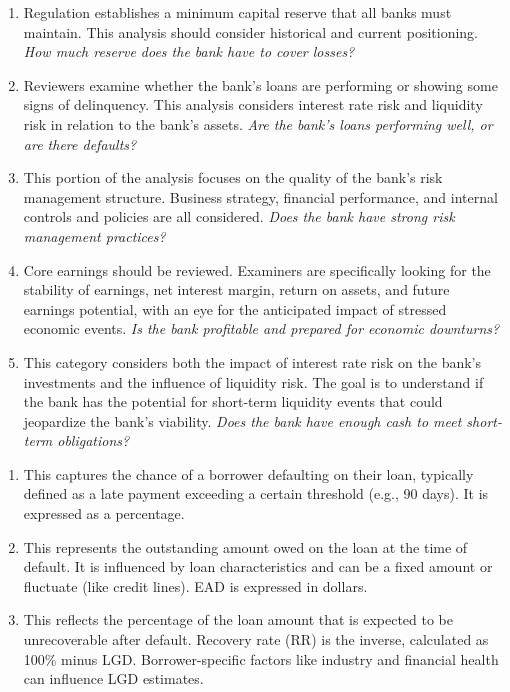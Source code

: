 \begin{enumerate}
\item {} Regulation establishes a minimum capital reserve
that all banks must maintain. This analysis should consider historical and
current positioning. \emph{How much reserve does the bank have to cover losses?}
\item {} Reviewers examine whether the bank's loans are
performing or showing some signs of delinquency. This analysis considers interest
rate risk and liquidity risk in relation to the bank's assets. \emph{Are the
bank's loans performing well, or are there defaults?}
\item {} This portion of the analysis focuses on the quality of
the bank's risk management structure. Business strategy, financial performance,
and internal controls and policies are all considered. \emph{Does the bank have
strong risk management practices?}
\item {} Core earnings should be reviewed. Examiners are
specifically looking for the stability of earnings, net interest margin, return on
assets, and future earnings potential, with an eye for the anticipated impact of
stressed economic events. \emph{Is the bank profitable and prepared for economic
downturns?}
\item {} This category considers both the impact of interest rate
risk on the bank's investments and the influence of liquidity risk. The goal is to
understand if the bank has the potential for short-term liquidity events that
could jeopardize the bank's viability. \emph{Does the bank have enough cash to
meet short-term obligations?}
\end{enumerate}


\begin{enumerate}
\item {} This captures the chance of a borrower
defaulting on their loan, typically defined as a late payment exceeding a certain
threshold (e.g., 90 days). It is expressed as a percentage.
\item {} This represents the outstanding amount
owed on the loan at the time of default. It is influenced by loan characteristics
and can be a fixed amount or fluctuate (like credit lines). EAD is expressed in
dollars.
\item {} This reflects the percentage of the loan
amount that is expected to be unrecoverable after default. Recovery rate (RR) is
the inverse, calculated as 100\% minus LGD. Borrower-specific factors like
industry and financial health can influence LGD estimates.
\end{enumerate}

